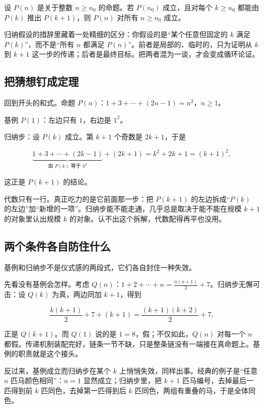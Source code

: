 \begin{theorem}
设 \(P(n)\) 是关于整数 \(n\ge n_0\) 的命题。若 \(P(n_0)\) 成立，且对每个 \(k\ge n_0\) 都能由 \(P(k)\) 推出 \(P(k+1)\)，则 \(P(n)\) 对所有 \(n\ge n_0\) 成立。
\end{theorem}

归纳假设的措辞里藏着一处精细的区分：你假设的是``某个任意但固定的 \(k\) 满足 \(P(k)\)''，而不是``所有 \(n\) 都满足 \(P(n)\)''。前者是局部的、临时的，只为证明从 \(k\) 到 \(k+1\) 这一步的传递；后者是最终目标。把两者混为一谈，才会变成循环论证。

\subsection{把猜想钉成定理}

回到开头的和式。命题 \(P(n)\)：\(1+3+\cdots+(2n-1)=n^2\)，\(n\ge 1\)。

基例 \(P(1)\)：左边只有 \(1\)，右边是 \(1^2\)。

归纳步：设 \(P(k)\) 成立。第 \(k+1\) 个奇数是 \(2k+1\)，于是

\[
\underbrace{1+3+\cdots+(2k-1)}_{\text{由 }P(k)\text{ 等于 }k^2}+(2k+1)
= k^2+2k+1=(k+1)^2 ,
\]

这正是 \(P(k+1)\) 的结论。

代数只有一行。真正吃力的是它前面那一步：把 \(P(k+1)\) 的左边拆成``\(P(k)\) 的左边''加``新增的一项''。归纳步能不能走通，几乎总是取决于能不能在规模 \(k+1\) 的对象里认出规模 \(k\) 的对象。认不出这个拆解，代数配得再平也没用。

\subsection{两个条件各自防住什么}

基例和归纳步不是仪式感的两段式，它们各自封住一种失效。

先看没有基例会怎样。考虑 \(Q(n)\)：\(1+2+\cdots+n=\frac{n(n+1)}{2}+7\)。归纳步无懈可击：设 \(Q(k)\) 为真，两边同加 \(k+1\)，得到

\[
\frac{k(k+1)}{2}+7+(k+1)=\frac{(k+1)(k+2)}{2}+7 ,
\]

正是 \(Q(k+1)\)。而 \(Q(1)\) 说的是 \(1=8\)，假；不仅如此，\(Q(n)\) 对每一个 \(n\) 都假。传递机制装配完好，链条一节不缺，只是整条链没有一端接在真命题上。基例的职责就是这个接头。

反过来，基例成立而归纳步在某个 \(k\) 上悄悄失效，同样出事。经典的例子是``任意 \(n\) 匹马颜色相同''：\(n=1\) 显然成立；归纳步里，把 \(k+1\) 匹马编号，去掉最后一匹得到前 \(k\) 匹同色，去掉第一匹得到后 \(k\) 匹同色，两组有重叠的马，于是全体同色。

